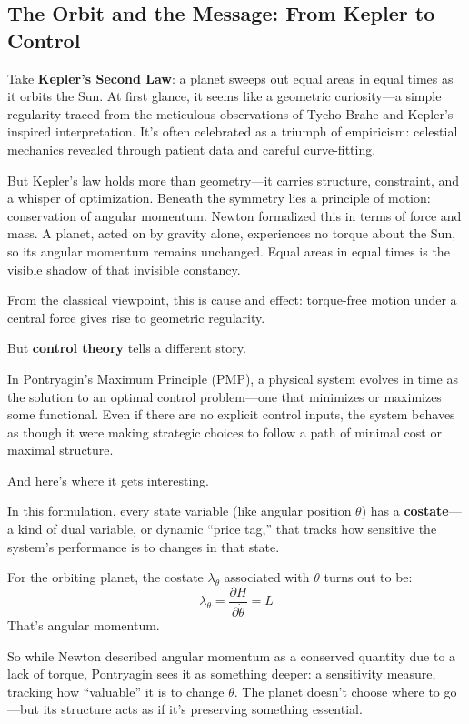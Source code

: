 \subsection{The Orbit and the Message: From Kepler to Control}

Take \textbf{Kepler’s Second Law}: a planet sweeps out equal areas in equal times as it orbits the Sun. At first glance, it seems like a geometric curiosity—a simple regularity traced from the meticulous observations of Tycho Brahe and Kepler’s inspired interpretation. It’s often celebrated as a triumph of empiricism: celestial mechanics revealed through patient data and careful curve-fitting.

But Kepler’s law holds more than geometry—it carries structure, constraint, and a whisper of optimization. Beneath the symmetry lies a principle of motion: conservation of angular momentum. Newton formalized this in terms of force and mass. A planet, acted on by gravity alone, experiences no torque about the Sun, so its angular momentum remains unchanged. Equal areas in equal times is the visible shadow of that invisible constancy.

From the classical viewpoint, this is cause and effect: torque-free motion under a central force gives rise to geometric regularity.

But \textbf{control theory} tells a different story.

In Pontryagin’s Maximum Principle (PMP), a physical system evolves in time as the solution to an optimal control problem—one that minimizes or maximizes some functional. Even if there are no explicit control inputs, the system behaves as though it were making strategic choices to follow a path of minimal cost or maximal structure.

And here’s where it gets interesting.

In this formulation, every state variable (like angular position \( \theta \)) has a \textbf{costate}—a kind of dual variable, or dynamic “price tag,” that tracks how sensitive the system's performance is to changes in that state.

For the orbiting planet, the costate \( \lambda_\theta \) associated with \( \theta \) turns out to be:
\[
\lambda_\theta = \frac{\partial H}{\partial \dot{\theta}} = L
\]
That’s angular momentum.

So while Newton described angular momentum as a conserved quantity due to a lack of torque, Pontryagin sees it as something deeper: a sensitivity measure, tracking how “valuable” it is to change \( \theta \). The planet doesn’t choose where to go—but its structure acts as if it’s preserving something essential.

